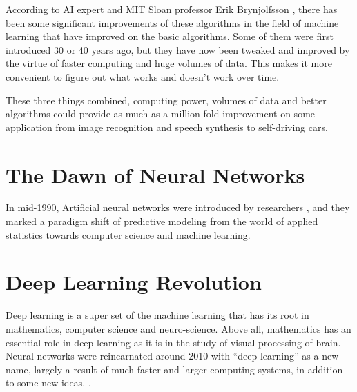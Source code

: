 According to AI expert and MIT Sloan professor Erik Brynjolfsson \cite{hbr_ai_business}, there has been some significant improvements of these algorithms in the field of machine learning that have improved on the basic algorithms. Some of them were first introduced 30 or 40 years ago, but they have now been tweaked and improved by the virtue of faster computing and huge volumes of data. This makes it more convenient to figure out what works and doesn't work over time.

These three things combined, computing power, volumes of data and better algorithms could provide as much as a million-fold improvement on some application from image recognition and speech synthesis to self-driving cars.

\section{The Dawn of Neural Networks}
In mid-1990, Artificial neural networks were introduced by researchers \cite{efron2016computer}, and they marked a paradigm shift of predictive modeling from the world of applied statistics towards computer science and machine learning.

\section{Deep Learning Revolution}

Deep learning is a super set of the machine learning that has its root in mathematics, computer science and neuro-science. Above all, mathematics has an essential role in deep learning as it is in the study of visual processing of brain. Neural networks were reincarnated around 2010 with “deep learning” as a new name, largely a result of much faster and larger computing systems, in addition to some new ideas. \cite{efron2016computer}.

